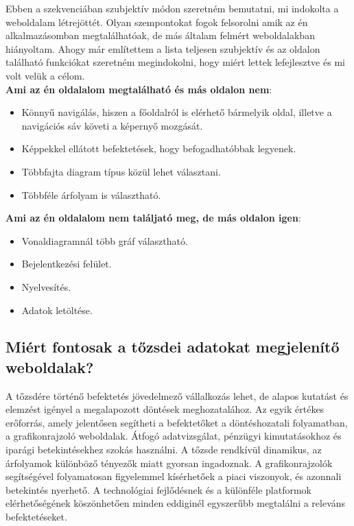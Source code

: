Ebben a szekvenciában szubjektív módon szeretném bemutatni, mi indokolta a weboldalam létrejöttét. Olyan szempontokat fogok felsorolni amik az én alkalmazásomban megtalálhatóak, de más általam felmért weboldalakban hiányoltam. Ahogy már említettem a lista teljesen szubjektív és az oldalon található funkciókat szeretném megindokolni, hogy miért lettek lefejlesztve és mi volt velük a célom. \\

\textbf{Ami az én oldalalom megtalálható és más oldalon nem}:

\begin{itemize}
\item Könnyű navigálás, hiszen a főoldalról is elérhető bármelyik oldal, illetve a navigációs sáv követi a képernyő mozgását. 
\item Képpekkel ellátott befektetések, hogy befogadhatóbbak legyenek.
\item Többfajta diagram típus közül lehet választani.
\item Többféle árfolyam is választható.
\end{itemize}

\textbf{Ami az én oldalalom nem találjató meg, de más oldalon igen}:

\begin{itemize}
\item Vonaldiagramnál több gráf választható.
\item Bejelentkezési felület.
\item Nyelvesítés.
\item Adatok letöltése.
\end{itemize}

\subsection {Miért fontosak a tőzsdei adatokat megjelenítő weboldalak?}

A tőzsdére történő befektetés jövedelmező vállalkozás lehet, de alapos kutatást és elemzést igényel a megalapozott döntések meghozatalához. Az egyik értékes erőforrás, amely jelentősen segítheti a befektetőket a döntéshozatali folyamatban, a grafikonrajzoló weboldalak. Átfogó adatvizsgálat, pénzügyi kimutatásokhoz és iparági betekintésekhez szokás használni. A tőzsde rendkívül dinamikus, az árfolyamok különböző tényezők miatt gyorsan ingadoznak. A grafikonrajzolók segítségével folyamatosan figyelemmel kísérhetőek a piaci viszonyok, és azonnali betekintés nyerhető.
A technológiai fejlődésnek és a különféle platformok elérhetőségének köszönhetően minden eddiginél egyszerűbb megtalálni a releváns befektetéseket.

